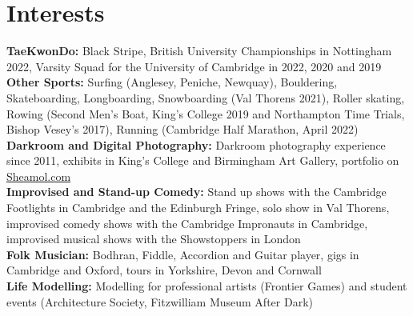 \documentclass{article}
\begin{document}
\section*{Interests}
\textbf{TaeKwonDo:} Black Stripe, British University Championships in Nottingham 2022, Varsity Squad for the University of Cambridge in 2022, 2020 and 2019\\
\textbf{Other Sports:} Surfing (Anglesey, Peniche, Newquay), Bouldering, Skateboarding, Longboarding, Snowboarding (Val Thorens 2021), Roller skating, Rowing (Second Men's Boat, King's College 2019 and Northampton Time Trials, Bishop Vesey's 2017), Running (Cambridge Half Marathon, April 2022)\\
\textbf{Darkroom and Digital Photography:} Darkroom photography experience since 2011,  exhibits in King's College and Birmingham Art Gallery, portfolio on \href{www.sheamol.com}{Sheamol.com}\\
\textbf{Improvised and Stand-up Comedy:} Stand up shows with the Cambridge Footlights in Cambridge and the Edinburgh Fringe, solo show in Val Thorens, improvised comedy shows with the Cambridge Impronauts in Cambridge, improvised musical shows with the Showstoppers in London \\
\textbf{Folk Musician:} Bodhran, Fiddle, Accordion and Guitar player, gigs in Cambridge and Oxford, tours in Yorkshire, Devon and Cornwall \\
\textbf{Life Modelling:} Modelling for professional artists (Frontier Games) and student events (Architecture Society, Fitzwilliam Museum After Dark)\medskip

\vspace{-.5\baselineskip}
\hrulefill
\vspace{-.5\baselineskip}
\end{document}
